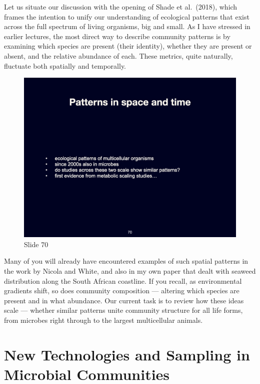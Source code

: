 \documentclass[
  12pt,
]{book}
\begin{document}
Let us situate our discussion with the opening of Shade et al.~(2018),
which frames the intention to unify our understanding of ecological
patterns that exist across the full spectrum of living organisms, big
and small. As I have stressed in earlier lectures, the most direct way
to describe community patterns is by examining which species are present
(their identity), whether they are present or absent, and the relative
abundance of each. These metrics, quite naturally, fluctuate both
spatially and temporally.

\begin{figure}[ht]
\centering
\includegraphics[width=0.8\linewidth]{../images/BDC334/BDC334-070.jpeg}
\caption*{Slide 70}
\end{figure}

Many of you will already have encountered examples of such spatial
patterns in the work by Nicola and White, and also in my own paper that
dealt with seaweed distribution along the South African coastline. If
you recall, as environmental gradients shift, so does community
composition --- altering which species are present and in what
abundance. Our current task is to review how these ideas scale ---
whether similar patterns unite community structure for all life forms,
from microbes right through to the largest multicellular animals.

\section{New Technologies and Sampling in Microbial
Communities}\label{new-technologies-and-sampling-in-microbial-communities}
\end{document}
